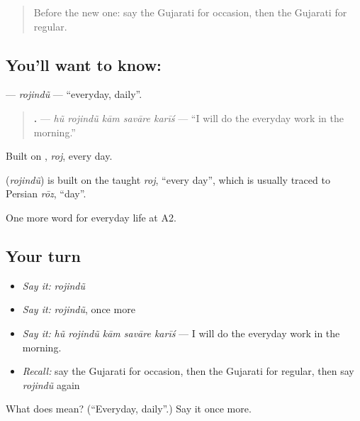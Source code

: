 \label{lesson:GU-C177-rojindu}



\begin{quote}
Before the new one: say the Gujarati for occasion, then the Gujarati for regular.
\end{quote}

\subsection*{You'll want to know: }
\textbf{} — \emph{rojindũ} — \textquotedblleft{}everyday, daily\textquotedblright{}.

\begin{quote}
\textbf{    .} — \emph{hũ rojindũ kām savāre karīś} — \textquotedblleft{}I will do the everyday work in the morning.\textquotedblright{}
\end{quote}

Built on \textbf{}, \emph{roj}, every day.

\begin{cousinweb}
\textbf{} (\emph{rojindũ}) is built on the taught \emph{roj}, \textquotedblleft{}every day\textquotedblright{}, which is usually traced to Persian \emph{rōz}, \textquotedblleft{}day\textquotedblright{}.
\end{cousinweb}

\begin{grammarlens}[title={What you've built}]
One more word for everyday life at A2.
\end{grammarlens}

\subsection*{Your turn}
\begin{itemize}
\raggedright
  \item \emph{Say it:} \emph{rojindũ}
  \item \emph{Say it:} \emph{rojindũ}, once more
  \item \emph{Say it:} \emph{hũ rojindũ kām savāre karīś} — I will do the everyday work in the morning.
  \item \emph{Recall:} say the Gujarati for occasion, then the Gujarati for regular, then say \emph{rojindũ} again
\end{itemize}

\begin{tcolorbox}[breakable,colback=teal!4,colframe=teal!35!black,title={Before you move on}]
What does  mean? (\textquotedblleft{}Everyday, daily\textquotedblright{}.) Say it once more.
\end{tcolorbox}
